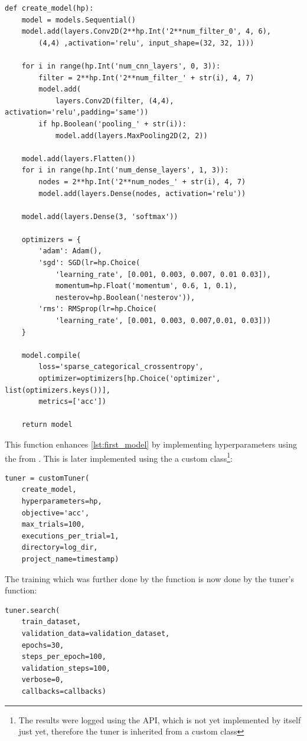 \begin{lstlisting}
def create_model(hp):
    model = models.Sequential()
    model.add(layers.Conv2D(2**hp.Int('2**num_filter_0', 4, 6),
        (4,4) ,activation='relu', input_shape=(32, 32, 1)))

    for i in range(hp.Int('num_cnn_layers', 0, 3)):
        filter = 2**hp.Int('2**num_filter_' + str(i), 4, 7)
        model.add(
            layers.Conv2D(filter, (4,4), activation='relu',padding='same'))
        if hp.Boolean('pooling_' + str(i)):
            model.add(layers.MaxPooling2D(2, 2))

    model.add(layers.Flatten())
    for i in range(hp.Int('num_dense_layers', 1, 3)):
        nodes = 2**hp.Int('2**num_nodes_' + str(i), 4, 7)
        model.add(layers.Dense(nodes, activation='relu'))
    
    model.add(layers.Dense(3, 'softmax'))

    optimizers = {
        'adam': Adam(),
        'sgd': SGD(lr=hp.Choice(
            'learning_rate', [0.001, 0.003, 0.007, 0.01 0.03]),
            momentum=hp.Float('momentum', 0.6, 1, 0.1),
            nesterov=hp.Boolean('nesterov')),
        'rms': RMSprop(lr=hp.Choice(
            'learning_rate', [0.001, 0.003, 0.007,0.01, 0.03]))
    }

    model.compile(
        loss='sparse_categorical_crossentropy',
        optimizer=optimizers[hp.Choice('optimizer', list(optimizers.keys())],
        metrics=['acc'])

    return model
\end{lstlisting}

This function enhances \ref{lst:first_model} by implementing hyperparameters using the  from .
This is later implemented using the a custom class\footnote{The results were logged using the  API, which is not yet implemented by  itself just yet, therefore the tuner is inherited from a custom class}:

\begin{lstlisting}
tuner = customTuner(
    create_model,
    hyperparameters=hp,
    objective='acc',
    max_trials=100,
    executions_per_trial=1,
    directory=log_dir,
    project_name=timestamp)
\end{lstlisting}

The training which was further done by the  function is now done by the tuner's  function:

\begin{lstlisting}
tuner.search(
    train_dataset,
    validation_data=validation_dataset,
    epochs=30,
    steps_per_epoch=100,
    validation_steps=100,
    verbose=0,
    callbacks=callbacks)
\end{lstlisting}

